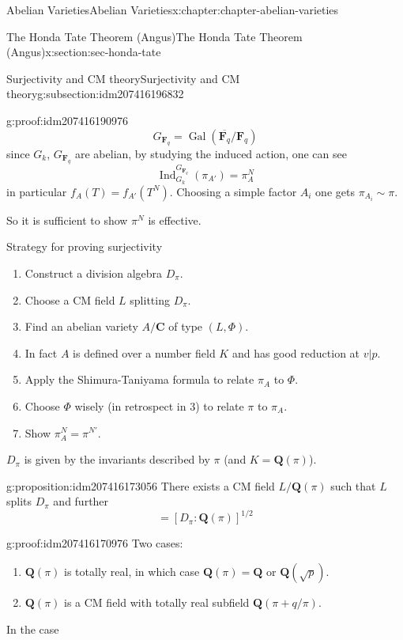 \documentclass[oneside,10pt,]{book}
\numberwithin{equation}{section}
\newcommand{\QQ}{\mathbf{Q}}
\newcommand{\CC}{\mathbf{C}}
\newcommand{\FF}{\mathbf{F}}
\newcommand{\Gal}[2]{\operatorname{Gal}(#1/#2)}
\DeclareMathOperator{\Ind}{Ind}
\begin{document}
\begin{chapterptx}{Abelian Varieties}{}{Abelian Varieties}{}{}{x:chapter:chapter-abelian-varieties}
\begin{sectionptx}{The Honda Tate Theorem (Angus)}{}{The Honda Tate Theorem (Angus)}{}{}{x:section:sec-honda-tate}
\begin{subsectionptx}{Surjectivity and CM theory}{}{Surjectivity and CM theory}{}{}{g:subsection:idm207416196832}
\begin{proofptx}{}{g:proof:idm207416190976}
\begin{equation*}
\end{equation*}
%
\begin{equation*}
G_{\FF_q} = \Gal{\overline{\FF_q}}{\FF_q}
\end{equation*}
since \(G_k\), \(G_{\FF_q}\) are abelian, by studying the induced action, one can see%
\begin{equation*}
\Ind_{G_k}^{G_{\FF_q}} (\pi_{A'}) = \pi_A^N
\end{equation*}
in particular \(f_A(T) = f_{A'}(T^N)\). Choosing a simple factor \(A_i\) one gets \(\pi_{A_i} \sim \pi\).%
\end{proofptx}
So it is sufficient to show \(\pi^N\) is effective.%
\par
Strategy for proving surjectivity%
\begin{enumerate}
\item{}Construct a division algebra \(D_\pi\).%
\item{}Choose a CM field \(L\) splitting \(D_\pi\).%
\item{}Find an abelian variety \(A/\CC\) of type \((L, \Phi)\).%
\item{}In fact \(A\) is defined over  a number field \(K\) and has good reduction at \(v|p\).%
\item{}Apply the Shimura-Taniyama formula to relate \(\pi_A\) to \(\Phi\).%
\item{}Choose \(\Phi\) wisely (in retrospect in 3) to relate \(\pi\) to \(\pi_A\).%
\item{}Show \(\pi_A^N = \pi^{N'}\).%
\end{enumerate}
%
\par
\(D_\pi\) is given by the invariants described by \(\pi\) (and \(K = \QQ(\pi)\)).%
\begin{proposition}{}{}{g:proposition:idm207416173056}%
There exists a CM field \(L/\QQ(\pi)\) such that \(L\) splits \(D_\pi\) and further%
\begin{equation*}
[L:\QQ(\pi) ] = [ D_\pi: \QQ(\pi)]^{1/2}
\end{equation*}
%
\end{proposition}
\begin{proofptx}{}{g:proof:idm207416170976}
Two cases:%
\begin{enumerate}
\item{}\(\QQ(\pi)\) is totally real, in which case \(\QQ(\pi) = \QQ\) or \(\QQ(\sqrt{p})\).%
\item{}\(\QQ(\pi)\) is a CM field with totally real subfield \(\QQ(\pi + q/\pi)\).%
\end{enumerate}
In the case%

\end{proofptx}
\end{subsectionptx}
\end{sectionptx}
\end{chapterptx}
\end{document}
